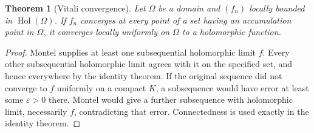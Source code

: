 \documentclass[11pt,a4paper,openany]{book}
\newtheorem{theorem}{Theorem}[chapter]
\theoremstyle{definition}
\theoremstyle{remark}\newtheorem{remark}[theorem]{Remark}
\newcommand{\eps}{\varepsilon}\newcommand{\ee}{\varepsilon}
\DeclareMathOperator{\Hol}{Hol}\DeclareMathOperator{\Mer}{Mer}
\newcommand{\family}[1]{}
\begin{document}
\begin{theorem}[Vitali convergence]\family{D12.11.05}\label{d12:11-05}
Let $\Omega$ be a domain and $(f_n)$ locally bounded in $\Hol(\Omega)$. If $f_n$ converges at every point of a set having an accumulation point in $\Omega$, it converges locally uniformly on $\Omega$ to a holomorphic function.
\end{theorem}
\begin{proof}
Montel supplies at least one subsequential holomorphic limit $f$. Every other subsequential holomorphic limit agrees with it on the specified set, and hence everywhere by the identity theorem. If the original sequence did not converge to $f$ uniformly on a compact $K$, a subsequence would have error at least some $\eps>0$ there. Montel would give a further subsequence with holomorphic limit, necessarily $f$, contradicting that error. Connectedness is used exactly in the identity theorem.
\end{proof}
\end{document}
